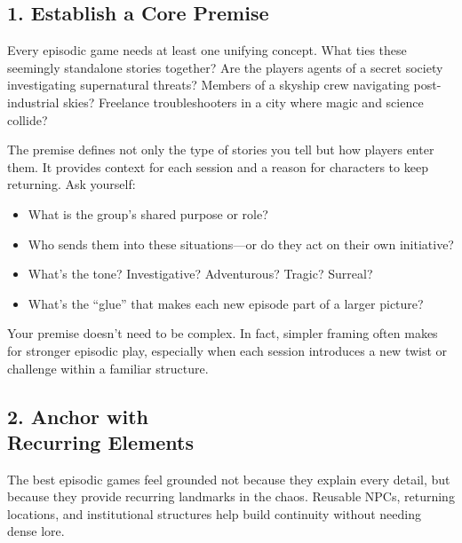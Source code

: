 \subsection*{1. Establish a Core Premise}

Every episodic game needs at least one unifying concept. What ties these seemingly standalone stories together? Are the players agents of a secret society investigating supernatural threats? Members of a skyship crew navigating post-industrial skies? Freelance troubleshooters in a city where magic and science collide?

The premise defines not only the type of stories you tell but how players enter them. It provides context for each session and a reason for characters to keep returning. Ask yourself:

\begin{itemize}
    \item What is the group’s shared purpose or role?
    \item Who sends them into these situations—or do they act on their own initiative?
    \item What’s the tone? Investigative? Adventurous? Tragic? Surreal?
    \item What’s the “glue” that makes each new episode part of a larger picture?
\end{itemize}

Your premise doesn't need to be complex. In fact, simpler framing often makes for stronger episodic play, especially when each session introduces a new twist or challenge within a familiar structure.

\subsection*{2. Anchor with\\ Recurring Elements}

The best episodic games feel grounded not because they explain every detail, but because they provide recurring landmarks in the chaos. Reusable NPCs, returning locations, and institutional structures help build continuity without needing dense lore.

